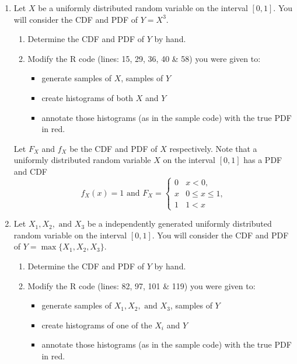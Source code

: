 \documentclass[
]{article}
\providecommand{\tightlist}{%
  \setlength{\itemsep}{0pt}\setlength{\parskip}{0pt}}
\begin{document}
\begin{enumerate}
\def\labelenumi{\arabic{enumi}.}
\item
  Let \(X\) be a uniformly distributed random variable on the interval \([0,1]\). You will consider the CDF and PDF of \(Y = X^{3}\).

  \begin{enumerate}
  \def\labelenumii{\alph{enumii}.}
  \tightlist
  \item
    Determine the CDF and PDF of \(Y\) by hand.
  \item
    Modify the R code (lines: 15, 29, 36, 40 \& 58) you were given to:

    \begin{itemize}
    \tightlist
    \item
      generate samples of \(X\), samples of \(Y\)
    \item
      create histograms of both \(X\) and \(Y\)
    \item
      annotate those histograms (as in the sample code) with the true PDF in red.
    \end{itemize}
  \end{enumerate}

  Let \(F_X\) and \(f_X\) be the CDF and PDF of \(X\) respectively. Note that a uniformly distributed random variable \(X\) on the interval \([0,1]\) has a PDF and CDF
  \[f_X(x) = 1 \text{ and } F_X = \begin{cases}
    0 & x < 0, \\
    x & 0 \leq x \leq 1, \\
    1 & 1 < x
    \end{cases}
    \]
\item
  Let \(X_1,X_2, \text{ and } X_3\) be a independently generated uniformly distributed random variable on the interval \([0,1]\). You will consider the CDF and PDF of \(Y = \max \{ X_1, X_2, X_3 \}\).

  \begin{enumerate}
  \def\labelenumii{\alph{enumii}.}
  \tightlist
  \item
    Determine the CDF and PDF of \(Y\) by hand.
  \item
    Modify the R code (lines: 82, 97, 101 \& 119) you were given to:

    \begin{itemize}
    \tightlist
    \item
      generate samples of \(X_1,X_2, \text{ and } X_3\), samples of \(Y\)
    \item
      create histograms of one of the \(X_i\) and \(Y\)
    \item
      annotate those histograms (as in the sample code) with the true PDF in red.
    \end{itemize}
  \end{enumerate}


\end{enumerate}
\end{document}
